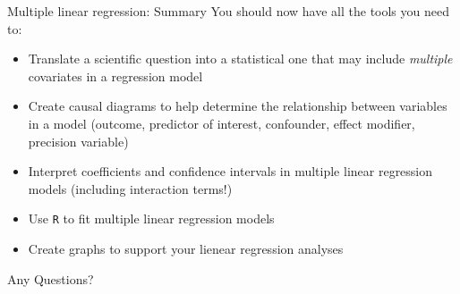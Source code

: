 \documentclass[10pt,t]{beamer}
\begin{document}
\begin{frame}{Multiple linear regression: Summary}
You should now have all the tools you need to:

\vspace{0.3cm}
\begin{itemize}
	\item Translate a scientific question into a statistical one that may include \textit{multiple} covariates in a regression model
	\item Create causal diagrams to help determine the relationship between variables in a model (outcome, predictor of interest, confounder, effect modifier, precision variable)
	\item Interpret coefficients and confidence intervals in multiple linear regression models (including interaction terms!)
	\item Use \texttt{R} to fit multiple linear regression models
	\item Create graphs to support your lienear regression analyses
\end{itemize}
\end{frame}

\begin{frame}[c]
\centering \huge Any Questions?
\end{frame}
\end{document}
